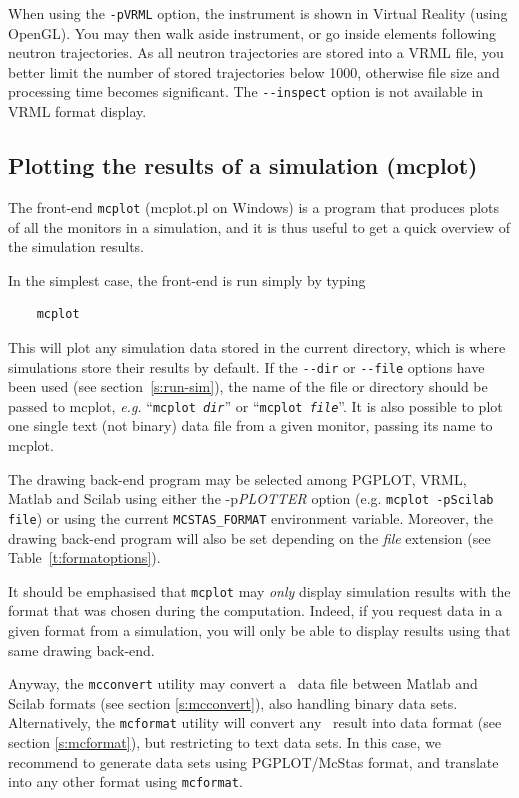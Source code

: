 When using the \verb+-pVRML+ option, the instrument is shown in Virtual Reality
(using OpenGL). You may then walk aside instrument, or go inside elements
following neutron trajectories. As all neutron trajectories are stored into a
VRML file, you better limit the number of stored trajectories below 1000,
otherwise file size and processing time becomes significant. The
\verb+--inspect+ option is not available in VRML format display.

\subsection{Plotting the results of a simulation (mcplot)}
\label{s:mcplot}

The front-end \verb+mcplot+ (mcplot.pl on Windows) is a program that produces
plots of all the monitors in a simulation, and it is thus useful to get
a quick overview of the simulation results.

In the simplest case, the front-end is run simply by typing
\begin{verbatim}
    mcplot
\end{verbatim}
This will plot any simulation data stored in the current directory, which is
where simulations store their results by default. If the \verb+--dir+ or
\verb+--file+ options have been used (see section~\ref{s:run-sim}), the name of
the file or directory should be passed to mcplot, {\em e.g.} ``\texttt{mcplot
  {\it dir}}'' or ``\texttt{mcplot {\it file}}''.  It is also possible to plot
one single text (not binary) data file from a given monitor, passing its name to
mcplot.

The drawing back-end program may be selected among PGPLOT, VRML, Matlab and
Scilab using either the -p{\it PLOTTER} option (e.g. \texttt{mcplot -pScilab
file}) or using the current \verb+MCSTAS_FORMAT+ environment
variable.  Moreover, the drawing
back-end program will also be set depending on the {\it file} extension (see
Table~\ref{t:formatoptions}).

It should be emphasised that \verb+mcplot+ may \emph{only} display simulation
results with the format that was chosen during the computation. Indeed, if you
request data in a given format from a simulation, you will only be able to
display results using that same drawing back-end.

Anyway, the \verb+mcconvert+ utility may convert a \MCS\ data file between
Matlab and Scilab formats (see section \ref{s:mcconvert}), also handling binary
data sets. Alternatively, the \verb+mcformat+ utility will convert any \MCS\
result into data format (see section \ref{s:mcformat}), but restricting to text
data sets. In this case, we recommend to generate data sets using PGPLOT/McStas
format, and translate into any other format using \verb+mcformat+.

